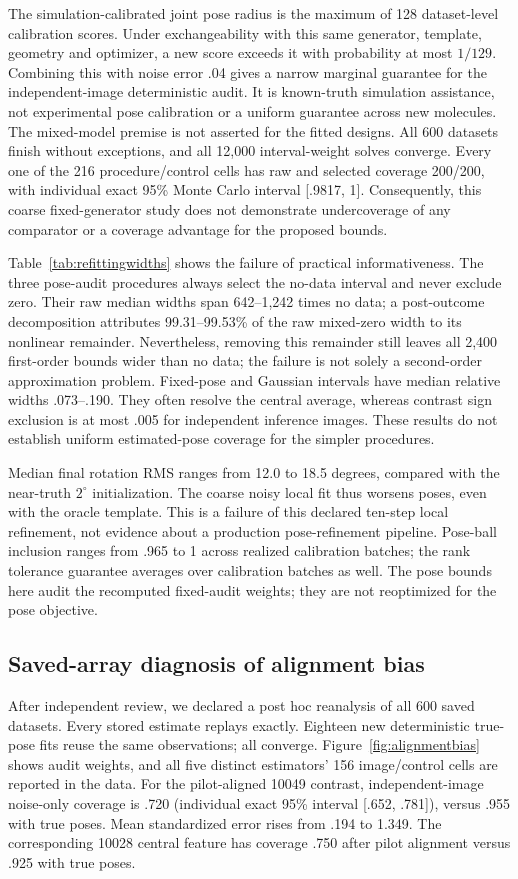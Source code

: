 \documentclass{article}
\begin{document}
The simulation-calibrated joint pose radius is the maximum of 128 dataset-level calibration scores. Under exchangeability with this same generator, template, geometry and optimizer, a new score exceeds it with probability at most $1/129$. Combining this with noise error .04 gives a narrow marginal guarantee for the independent-image deterministic audit. It is known-truth simulation assistance, not experimental pose calibration or a uniform guarantee across new molecules. The mixed-model premise is not asserted for the fitted designs.
All 600 datasets finish without exceptions, and all 12,000 interval-weight solves converge. Every one of the 216 procedure/control cells has raw and selected coverage 200/200, with individual exact 95\% Monte Carlo interval [.9817, 1]. Consequently, this coarse fixed-generator study does not demonstrate undercoverage of any comparator or a coverage advantage for the proposed bounds.

Table~\ref{tab:refittingwidths} shows the failure of practical informativeness. The three pose-audit procedures always select the no-data interval and never exclude zero. Their raw median widths span 642--1,242 times no data; a post-outcome decomposition attributes 99.31--99.53\% of the raw mixed-zero width to its nonlinear remainder. Nevertheless, removing this remainder still leaves all 2,400 first-order bounds wider than no data; the failure is not solely a second-order approximation problem. Fixed-pose and Gaussian intervals have median relative widths .073--.190. They often resolve the central average, whereas contrast sign exclusion is at most .005 for independent inference images. These results do not establish uniform estimated-pose coverage for the simpler procedures.

Median final rotation RMS ranges from 12.0 to 18.5 degrees, compared with the near-truth $2^\circ$ initialization. The coarse noisy local fit thus worsens poses, even with the oracle template. This is a failure of this declared ten-step local refinement, not evidence about a production pose-refinement pipeline. Pose-ball inclusion ranges from .965 to 1 across realized calibration batches; the rank tolerance guarantee averages over calibration batches as well. The pose bounds here audit the recomputed fixed-audit weights; they are not reoptimized for the pose objective.


\subsection{Saved-array diagnosis of alignment bias}
After independent review, we declared a post hoc reanalysis of all 600 saved datasets. Every stored estimate replays exactly. Eighteen new deterministic true-pose fits reuse the same observations; all converge. Figure~\ref{fig:alignmentbias} shows audit weights, and all five distinct estimators' 156 image/control cells are reported in the data. For the pilot-aligned 10049 contrast, independent-image noise-only coverage is .720 (individual exact 95\% interval [.652, .781]), versus .955 with true poses. Mean standardized error rises from .194 to 1.349. The corresponding 10028 central feature has coverage .750 after pilot alignment versus .925 with true poses.
\end{document}
